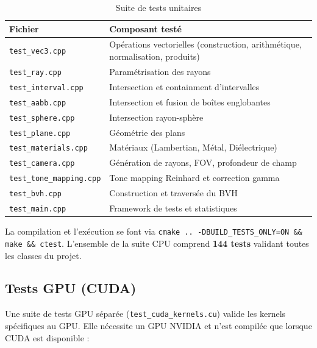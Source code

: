 \documentclass[12pt,a4paper]{article}
\begin{document}
\begin{table}[H]
\centering
\begin{tabular}{ll}
\toprule
\textbf{Fichier} & \textbf{Composant testé} \\
\midrule
\texttt{test\_vec3.cpp}     & Opérations vectorielles (construction, arithmétique, normalisation, produits) \\
\texttt{test\_ray.cpp}      & Paramétrisation des rayons \\
\texttt{test\_interval.cpp} & Intersection et containment d'intervalles \\
\texttt{test\_aabb.cpp}     & Intersection et fusion de boîtes englobantes \\
\texttt{test\_sphere.cpp}   & Intersection rayon-sphère \\
\texttt{test\_plane.cpp}    & Géométrie des plans \\
\texttt{test\_materials.cpp} & Matériaux (Lambertian, Métal, Diélectrique) \\
\texttt{test\_camera.cpp}    & Génération de rayons, FOV, profondeur de champ \\
\texttt{test\_tone\_mapping.cpp} & Tone mapping Reinhard et correction gamma \\
\texttt{test\_bvh.cpp}       & Construction et traversée du BVH \\
\texttt{test\_main.cpp}      & Framework de tests et statistiques \\
\bottomrule
\end{tabular}
\caption{Suite de tests unitaires}
\end{table}

La compilation et l'exécution se font via \texttt{cmake .. -DBUILD\_TESTS\_ONLY=ON \&\& make \&\& ctest}.
L'ensemble de la suite CPU comprend \textbf{144 tests} validant toutes les classes du projet.

\subsection{Tests GPU (CUDA)}

Une suite de tests GPU séparée (\texttt{test\_cuda\_kernels.cu}) valide les kernels
spécifiques au GPU. Elle nécessite un GPU NVIDIA et n'est compilée que lorsque
CUDA est disponible :
\end{document}
